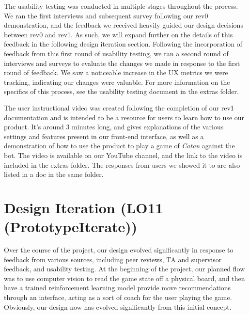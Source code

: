 \documentclass{article}
\begin{document}
The usability testing was conducted in multiple stages throughout the process.
We ran the first interviews and subsequent survey following our rev0 demonstration, and the feedback we
received heavily guided our design decisions between rev0 and rev1.
As such, we will expand further on the details of this feedback in the following design iteration section.
Following the incorporation of feedback from this first round of usability testing, we ran a second round
of interviews and surveys to evaluate the changes we made in response to the first round of feedback.
We saw a noticeable increase in the UX metrics we were tracking, indicating our changes were valuable.
For more information on the specifics of this process, see the usability testing document in the extras folder.

The user instructional video was created following the completion of our rev1 documentation
and is intended to be a resource for users to learn how to use our product.
It's around 3 minutes long, and gives explanations of the various settings and features present in our
front-end interface, as well as a demonstration of how to use the product to play a game of \emph{Catan} against the bot.
The video is available on our YouTube channel, and the link to the video is included in the extras folder.
The responses from users we showed it to are also listed in a doc in the same folder.

\section{Design Iteration (LO11 (PrototypeIterate))}

%

Over the course of the project, our design evolved significantly in response to feedback from various sources,
including peer reviews, TA and supervisor feedback, and usability testing.
At the beginning of the project, our planned flow was to use computer vision to read the game state off a
physical board, and then have a trained reinforcement learning model provide move recommendations
through an interface, acting as a sort of coach for the user playing the game.
Obviously, our design now has evolved significantly from this initial concept.
\end{document}
